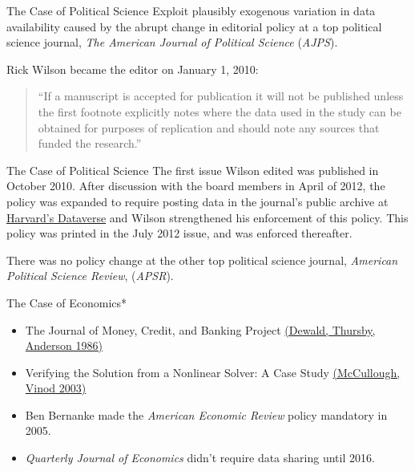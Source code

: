 \documentclass{beamer}
\begin{document}
\begin{frame}{The Case of Political Science}
Exploit plausibly exogenous variation in data availability caused by the abrupt change in editorial policy at a top political science journal, \textit{The American Journal of Political Science} (\textit{AJPS}). 

Rick Wilson became the editor on January 1, 2010:
\begin{quote} ``If a manuscript is accepted for publication it will not be published unless the first footnote explicitly notes where the data used in the study can be obtained for purposes of replication and should note any sources that funded the research.''
\end{quote}
\end{frame}

\begin{frame}{The Case of Political Science}
The first issue Wilson edited was published in October 2010. After discussion with the board members in April of 2012, the policy was expanded to require posting data in the journal's public archive at \href{https://thedata.harvard.edu/dvn/dv/ajps}{Harvard's Dataverse} and Wilson strengthened his enforcement of this policy. This policy was printed in the July 2012 issue, and was enforced thereafter.
\vspace{0.25in}

There was no policy change at the other top political science journal, \textit{American Political Science Review}, (\textit{APSR}).
\end{frame}

\begin{frame}{The Case of Economics*}
\begin{itemize}
\item The Journal of Money, Credit, and Banking Project \href{http://www.jstor.org/stable/3132121}{(Dewald, Thursby, Anderson 1986)}
\item Verifying the Solution from a Nonlinear Solver: A Case Study \href{http://www.jstor.org/stable/3132121}{(McCullough, Vinod 2003)}
\item Ben Bernanke made the \textit{American Economic Review} policy mandatory in 2005.
\item \textit{Quarterly Journal of Economics} didn't require data sharing until 2016.
\end{itemize}
\end{frame}
\end{document}
